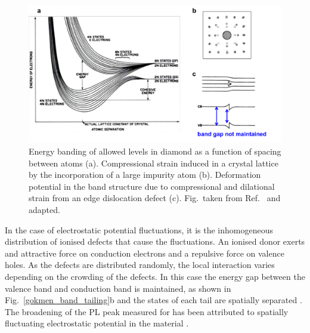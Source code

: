 \documentclass[11pt, twoside]{report}
\begin{document}
\begin{figure}[h!]
  \centering
    \includegraphics[width=1.0\textwidth]{figures/pankove_band_fluc.png}
    \caption[Energy banding of allowed levels in diamond as a function of spacing between atoms (a). Compressional strain induced in a crystal lattice by the incorporation of a large impurity atom (b). Deformation potential in the band structure due to compressional and dilational strain from an edge dislocation defect (c).]{Energy banding of allowed levels in diamond as a function of spacing between atoms (a). Compressional strain induced in a crystal lattice by the incorporation of a large impurity atom (b). Deformation potential in the band structure due to compressional and dilational strain from an edge dislocation defect (c). Fig.~taken from Ref.~ and adapted.}
  \label{pankove_band_fluc}
\end{figure}

In the case of electrostatic potential fluctuations, it is the inhomogeneous distribution of ionised defects that cause the fluctuations. An ionised donor exerts and attractive force on conduction electrons and a repulsive force on valence holes. As the defects are distributed randomly, the local interaction varies depending on the crowding of the defects. In this case the energy gap between the valence band and conduction band is maintained, as shown in Fig.~\ref{gokmen_band_tailing}b and the states of each tail are spatially separated \cite{Pankove}. The broadening of the PL peak measured for {\CZTS} has been attributed to spatially fluctuating electrostatic potential in the material \cite{CZTS_TEM}.

\end{document}
